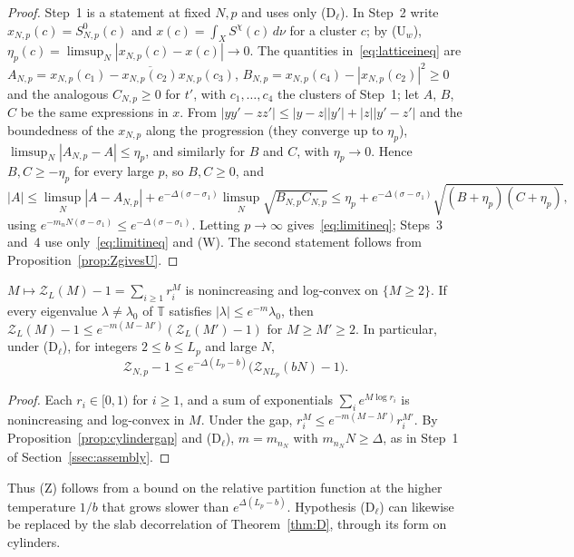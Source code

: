 \begin{proof}
Step~1 is a statement at fixed $N,p$ and uses only (D$_\ell$). In Step~2
write $x_{N,p}(c)=S^0_{N,p}(c)$ and $x(c)=\int_XS^\chi(c)\,d\nu$ for a
cluster $c$; by (U$_w$), $\eta_p(c)=\limsup_N|x_{N,p}(c)-x(c)|\to0$. The
quantities in~\eqref{eq:latticeineq} are $A_{N,p}=x_{N,p}(c_1)-\overline{
x_{N,p}(c_2)}x_{N,p}(c_3)$, $B_{N,p}=x_{N,p}(c_4)-|x_{N,p}(c_2)|^2\ge0$ and
the analogous $C_{N,p}\ge0$ for $t'$, with $c_1,\dots,c_4$ the clusters of
Step~1; let $A$, $B$, $C$ be the same expressions in $x$. From
$|yy'-zz'|\le|y-z||y'|+|z||y'-z'|$ and the boundedness of the $x_{N,p}$ along
the progression (they converge up to $\eta_p$), $\limsup_N|A_{N,p}-A|\le
\eta_p$, and similarly for $B$ and $C$, with $\eta_p\to0$. Hence $B,C\ge
-\eta_p$ for every large $p$, so $B,C\ge0$, and
\[
|A|\le\limsup_N|A-A_{N,p}|+e^{-\Delta(\sigma-\sigma_1)}\limsup_N\sqrt{B_{N,p}
C_{N,p}}\le\eta_p+e^{-\Delta(\sigma-\sigma_1)}\sqrt{(B+\eta_p)(C+\eta_p)},
\]
using $e^{-m_nN(\sigma-\sigma_1)}\le e^{-\Delta(\sigma-\sigma_1)}$. Letting
$p\to\infty$ gives~\eqref{eq:limitineq}; Steps~3 and~4 use
only~\eqref{eq:limitineq} and (W). The second statement follows from
Proposition~\ref{prop:ZgivesU}.
\end{proof}

\begin{lemma}\label{lem:Zmonotone}
$M\mapsto\mathcal Z_L(M)-1=\sum_{i\ge1}r_i^M$ is nonincreasing and
log-convex on $\{M\ge2\}$. If every eigenvalue $\lambda\ne\lambda_0$ of
$\mathbb T$ satisfies $|\lambda|\le e^{-m}\lambda_0$, then $\mathcal Z_L(M)-1
\le e^{-m(M-M')}(\mathcal Z_L(M')-1)$ for $M\ge M'\ge2$. In particular, under
\textup{(D$_\ell$)}, for integers $2\le b\le L_p$ and large $N$,
\[
\mathcal Z_{N,p}-1\le e^{-\Delta(L_p-b)}\bigl(\mathcal Z_{NL_p}(bN)-1\bigr).
\]
\end{lemma}

\begin{proof}
Each $r_i\in[0,1)$ for $i\ge1$, and a sum of exponentials $\sum_ie^{M\log r_i}$
is nonincreasing and log-convex in $M$. Under the gap, $r_i^M\le
e^{-m(M-M')}r_i^{M'}$. By Proposition~\ref{prop:cylindergap} and
(D$_\ell$), $m=m_{n_N}$ with $m_{n_N}N\ge\Delta$, as in Step~1 of
Section~\ref{ssec:assembly}.
\end{proof}

Thus (Z) follows from a bound on the relative partition function at the
higher temperature $1/b$ that grows slower than $e^{\Delta(L_p-b)}$.
Hypothesis (D$_\ell$) can likewise be replaced by the slab decorrelation of
Theorem~\ref{thm:D}, through its form on cylinders.

